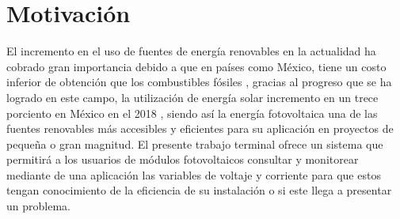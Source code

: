 \section{Motivación}
El incremento en el uso de fuentes de energía renovables en la actualidad ha cobrado gran importancia debido a que en países como México, tiene un costo inferior de obtención que los combustibles fósiles \citep{Not1}, gracias al progreso que se ha logrado en este campo, la utilización de energía solar incremento en un trece porciento en México en el 2018 \citep{Not2}, siendo así la energía fotovoltaica una de las fuentes renovables más accesibles y eficientes para su aplicación en proyectos de pequeña o gran magnitud.
El presente trabajo terminal ofrece un sistema que permitirá a los usuarios de módulos fotovoltaicos consultar y monitorear mediante de una aplicación las variables de voltaje y corriente para que estos tengan conocimiento de la eficiencia de su instalación o si este llega a presentar un problema. 
